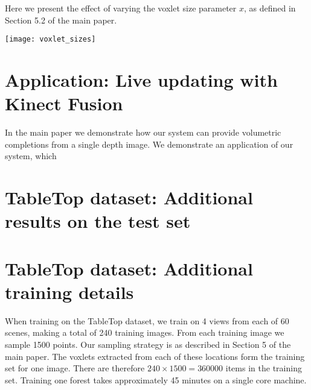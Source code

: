 \documentclass[10pt,onecolumn,letterpaper]{article}
\newcommand{\note}[1]{\textcolor{blue}{NOTE: #1}}
\begin{document}
Here we present the effect of varying the voxlet size parameter $x$, as defined in Section 5.2 of the main paper.

\begin{figure*}[h!]
    \texttt{[image: voxlet\_sizes]}
\end{figure*}

\newpage
\section{Application: Live updating with Kinect Fusion}

In the main paper we demonstrate how our system can provide volumetric completions from a single depth image.
We demonstrate an application of our system, which




\newpage
\section{TableTop dataset: Additional results on the test set}
%

\newcommand{\omaheight}{0.13\columnwidth}
    
\label{fig:bb}


\newpage
\section{TableTop dataset: Additional training details}

When training on the TableTop dataset, we train on 4 views from each of 60 scenes, making a total of 240 training images.
From each training image we sample 1500 points. Our sampling strategy is as described in Section 5 of the main paper.
The voxlets extracted from each of these locations form the training set for one image.
There are therefore $240 \times 1500 = 360000$ items in the training set.
Training one forest takes approximately 45 minutes on a single core machine.

\newpage
\end{document}
